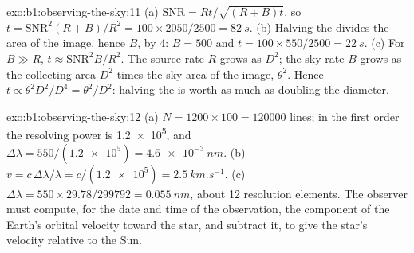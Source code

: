 \begin{solution}{exo:b1:observing-the-sky:11}
(a) $\mathrm{SNR} = Rt/\sqrt{(R + B)t}$, so $t = \mathrm{SNR}^2(R + B)/R^2
= 100\times2050/2500 = \qty{82}{s}$. (b) Halving the  divides the
area of the image, hence $B$, by 4: $B = 500$ and $t = 100\times550/2500 =
\qty{22}{s}$. (c) For $B \gg R$, $t \approx \mathrm{SNR}^2B/R^2$. The source
rate $R$ grows as $D^2$; the sky rate $B$ grows as the collecting area
$D^2$ times the sky area of the image, $\theta^2$. Hence $t \propto
\theta^2D^2/D^4 = \theta^2/D^2$: halving the  is worth as much as
doubling the diameter.
\end{solution}

\begin{solution}{exo:b1:observing-the-sky:12}
(a) $N = 1200\times100 = \num{120000}$ lines; in the first order the
resolving power is \num{1.2e5}, and $\Delta\lambda = 550/(\num{1.2e5}) =
\qty{4.6e-3}{nm}$. (b) $v = c\,\Delta\lambda/\lambda = c/(\num{1.2e5}) =
\qty{2.5}{km.s^{-1}}$. (c) $\Delta\lambda = 550\times29.78/\num{299792} =
\qty{0.055}{nm}$, about 12 resolution elements. The observer must compute,
for the date and time of the observation, the component of the Earth's
orbital velocity toward the star, and subtract it, to give the star's
velocity relative to the Sun.
\end{solution}

